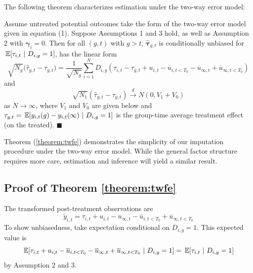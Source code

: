 \documentclass[12pt]{article}
\begin{document}
The following theorem characterizes estimation under the two-way error model:
\begin{theorem}\label{theorem:twfe}
    Assume untreated potential outcomes take the form of the two-way error model given in equation (1). Suppose Assumptions 1 and 3 hold, as well as Assumption 2 with $\bm \gamma_i = 0$. Then for all $(g, t)$ with $g > t$, $\widehat{\bm \tau}_{g,t}$ is conditionally unbiased for $\expec{\tau_{i,t}}{D_{i,g} = 1}$, has the linear form
    \begin{equation}\label{eq:twfe_influence}
        \sqrt{N_{g}} \big( \widehat{\tau}_{g,t} - \tau_{g,t} \big) 
        = \frac{1}{\sqrt{N_{g}}}\sum_{i=1}^N D_{i,g} (\tau_{i,t} - \tau_{g,t} + u_{i,t} - \overline{u}_{i,t < T_0} - \overline{u}_{\infty,t} + \overline{u}_{\infty,t < T_0})
    \end{equation}
    and  
    \begin{equation}\label{eq:twfe_asymptotic}
        \sqrt{N_1}(\widehat{\tau}_{g,t} - \tau_{g,t}) \stackrel{d}{\rightarrow} N(0, V_1 + V_0)
    \end{equation}
    as $N \rightarrow \infty$, where $V_1$ and $V_0$ are given below and $\tau_{g,t} = \expec{y_{i,t}(g) - y_{i,t}(\infty)}{D_{i,g} = 1}$ is the group-time average treatment effect (on the treated). $\blacksquare$
\end{theorem}
Theorem (\ref{theorem:twfe}) demonstrates the simplicity of our imputation procedure under the two-way error model. While the general factor structure requires more care, estimation and inference will yield a similar result.


\subsection*{Proof of Theorem \ref{theorem:twfe}}

The transformed post-treatment observations are
\begin{equation}
    \tilde{y}_{i,t} = \tau_{i,t} + u_{i,t} - \overline{u}_{\infty,t}  - \overline{u}_{i,t < T_0} + \overline{u}_{\infty,t < T_0}
\end{equation}
To show unbiasedness, take expectation conditional on $D_{i,g} = 1$. This expected value is
\begin{equation}
    \expec{ \tau_{i,t} + u_{i,t} - \overline{u}_{i,t < T_0} - \overline{u}_{\infty,t} + \overline{u}_{\infty,t < T_0} }{D_{i,g} = 1} = \expec{\tau_{i,t}}{D_{i,g} = 1}
\end{equation}
by Assumption 2 and 3.
\end{document}
